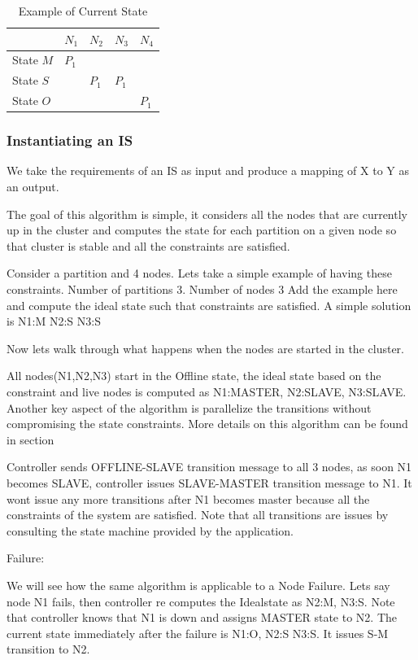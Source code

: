 {\begin{table}
\centering
\begin{tabular}{|l|l|l|l|l|} \hline \hline
            & \(N_1\) & \(N_2\) & \(N_3\) & \(N_4\) \\ \hline \hline
State \(M\)       & \(P_1\)  &         &         & \\ \hline 
State \(S\)       &         & \(P_1\) & \(P_1\) & \\ \hline 
State \(O\)       &         &         &         & \(P_1\) \\ \hline 
\end{tabular}
\label{CS_Example}
\caption{Example of Current State}
\end{table}

\subsubsection{Instantiating an IS}
We take the requirements of an IS as input and produce a mapping of X to
Y as an output.

The goal of this algorithm is simple, it
considers all the nodes that are currently up in the cluster and
computes the state for each partition on a given node so that cluster
is stable and all the constraints are satisfied.


Consider a partition and 4 nodes. 
Lets take a simple example of having these constraints.  Number of
partitions 3. Number of nodes 3 Add the example here and compute the
ideal state such that constraints are satisfied. A simple solution is
N1:M N2:S N3:S

Now lets walk through what happens when the nodes are started in the
cluster.

All nodes(N1,N2,N3) start in the Offline state, the ideal state based
on the constraint and live nodes is computed as N1:MASTER, N2:SLAVE,
N3:SLAVE. Another key aspect of the algorithm is parallelize the
transitions without compromising the state constraints. More details
on this algorithm can be found in section

Controller sends OFFLINE-SLAVE transition message to all 3 nodes, as
soon N1 becomes SLAVE, controller issues SLAVE-MASTER transition
message to N1. It wont issue any more transitions after N1 becomes
master because all the constraints of the system are satisfied. Note
that all transitions are issues by consulting the state machine
provided by the application.

Failure:

We will see how the same algorithm is applicable to a Node Failure.
Lets say node N1 fails, then controller re computes the Idealstate as
N2:M, N3:S. Note that controller knows that N1 is down and assigns
MASTER state to N2.  The current state immediately after the failure
is N1:O, N2:S N3:S. It issues S-M transition to N2.

}
